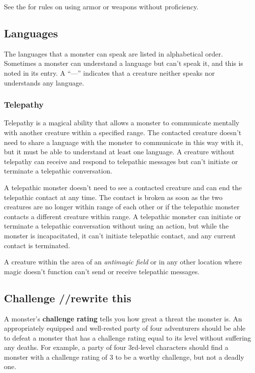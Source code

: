 See the  for rules on using armor or weapons without proficiency.

\subsection{Languages}

The languages that a monster can speak are listed in alphabetical order. Sometimes a monster can understand a language but can't speak it, and this is noted in its entry. A “—” indicates that a creature neither speaks nor understands any language.

\subsubsection{Telepathy}

Telepathy is a magical ability that allows a monster to communicate mentally with another creature within a specified range. The contacted creature doesn't need to share a language with the monster to communicate in this way with it, but it must be able to understand at least one language. A creature without telepathy can receive and respond to telepathic messages but can't initiate or terminate a telepathic conversation.

A telepathic monster doesn't need to see a contacted creature and can end the telepathic contact at any time. The contact is broken as soon as the two creatures are no longer within range of each other or if the telepathic monster contacts a different creature within range. A telepathic monster can initiate or terminate a telepathic conversation without using an action, but while the monster is incapacitated, it can't initiate telepathic contact, and any current contact is terminated.

A creature within the area of an \textit{antimagic field} or in any other location where magic doesn't function can't send or receive telepathic messages.

\subsection{Challenge //rewrite this}

A monster's \textbf*{challenge rating} tells you how great a threat the monster is. An appropriately equipped and well-rested party of four adventurers should be able to defeat a monster that has a challenge rating equal to its level without suffering any deaths. For example, a party of four 3rd-level characters should find a monster with a challenge rating of 3 to be a worthy challenge, but not a deadly one.

